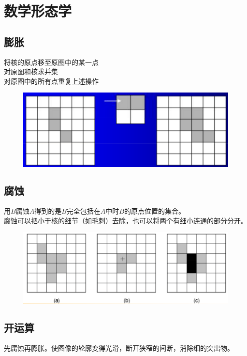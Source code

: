 \documentclass[11pt]{article}
\begin{document}
\section{数学形态学}

\subsection{膨胀}
 将核的原点移至原图中的某一点  \\
 对原图和核求并集  \\
 对原图中的所有点重复上述操作  \\
\begin{figure}[htb]
    \centering
    \includegraphics[scale=0.1]{imgs/dilate.png}
\end{figure}

\subsection{腐蚀}
用$B$腐蚀$A$得到的是$B$完全包括在$A$中时$B$的原点位置的集合。  \\
腐蚀可以把小于核的细节（如毛刺）去除，也可以将两个有细小连通的部分分开。
\begin{figure}[htb]
    \centering
    \includegraphics[scale=0.1]{imgs/erode.png}
\end{figure}

\subsection{开运算}
先腐蚀再膨胀。使图像的轮廓变得光滑，断开狭窄的间断，消除细的突出物。
\end{document}
